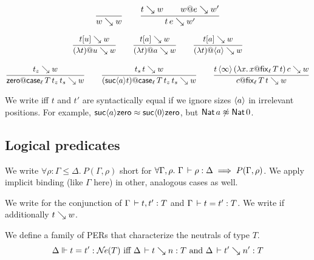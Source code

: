 \documentclass[acmlarge,review,anonymous]{acmart}\settopmatter{printfolios=true}
\begin{document}
\begin{gather*}
  \ru{}{w \evalsto w}
\qquad
  \ru{t \evalsto w \qquad w @ e \evalsto w'}{t\,e \evalsto w'}
\end{gather*}


\begin{gather*}
  \ru{t[u] \evalsto w
    }{(\lambda t) @ u \evalsto w}
\qquad
  \ru{t[a] \evalsto w
    }{(\lambda t) @ a \evalsto w}
\qquad
  \ru{t[a] \evalsto w
    }{(\lambda t) @ \ann a \evalsto w}
\\[2ex]
  \ru{t_z \evalsto w
    }{\tzero @ \casett \evalsto w}
\qquad
  \ru{t_s\, t \evalsto w
    }{(\suc a t) @ \casett \evalsto w}
\qquad
  \ru{t\,\ann\infty\,(\lambda x.\, x@ \fixtt)\,c \evalsto w
     }{c @ \fixtt \evalsto w
     }%
\end{gather*}

We write  iff $t$ and $t'$ are syntactically equal if we ignore sizes $\langle a\rangle$ in irrelevant positions.  For example, $\mathsf{suc}\langle a\rangle \mathsf{zero} \approx \mathsf{suc}\langle0\rangle \mathsf{zero}$, but $\mathsf{Nat}\, a \not\approx \mathsf{Nat}\, 0$.


\subsection{Logical predicates}

We write $\forall \rho : \Gamma \leq \Delta.~ P(\Gamma,\rho)$ short for
$\forall \Gamma, \rho.~ \Gamma \,\vdash \rho : \Delta \implies P(\Gamma,\rho)$.
We apply implicit binding (like $\Gamma$ here) in other, analogous cases as well.

We write  for the conjunction of $\Gamma \,\vdash t,t' : T$ and $\Gamma \,\vdash t = t' : T$.  We write  if additionally $t \searrow w$.

We define a family of PERs  that characterize the neutrals of type $T$.
\[
  \Delta \Vdash t = t' : \mathcal{N}\!\mathit{e}(T) \ \mbox{iff}\  \Delta \,\vdash t \searrow n : T \ \mbox{and}\  \Delta \,\vdash t' \searrow n' : T
\]
\end{document}
